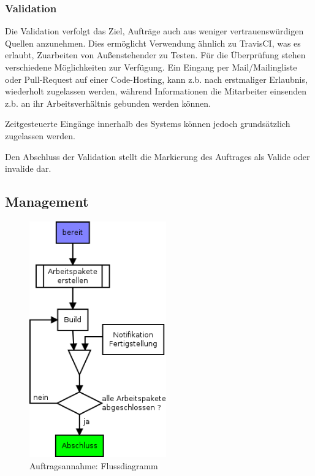 \subsubsection{Validation}


Die Validation verfolgt das Ziel, Aufträge auch aus weniger vertrauenswürdigen Quellen anzunehmen.
Dies ermöglicht Verwendung ähnlich zu TravisCI, was es erlaubt, Zuarbeiten von Außenstehender zu Testen.
Für die Überprüfung stehen verschiedene Möglichkeiten zur Verfügung.
Ein Eingang per Mail/Mailingliste oder Pull-Request auf einer Code-Hosting,
kann z.b. nach erstmaliger Erlaubnis, wiederholt zugelassen werden,
während Informationen die Mitarbeiter einsenden z.b. an ihr Arbeitsverhältnis gebunden werden können.

Zeitgesteuerte Eingänge innerhalb des Systems können jedoch grundsätzlich zugelassen werden.

Den Abschluss der Validation stellt die Markierung des Auftrages als Valide oder invalide dar.

\subsection{Management}

\begin{figure}[ht] 
  \centering
  \includegraphics[height=4in]{imageinput/lebenszyklus-auftrag-abarbeitung.png}
  \caption{Auftragsannahme: Flussdiagramm}
  \label{fig:lebenszyklus-auftrag-abarbeitung}
\end{figure}

